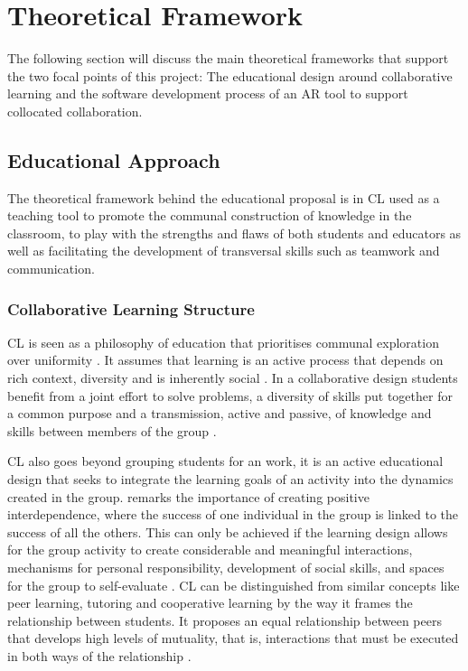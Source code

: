 \section{Theoretical Framework \label{sec:3-3}}

The following section will discuss the main theoretical frameworks that support the two focal points of this project: The educational design around collaborative learning and the
software development process of an \ac{AR} tool to support collocated collaboration.

\subsection{Educational Approach \label{sec:3-3-1}}

The theoretical framework behind the educational proposal is in \acf{CL} used as a teaching tool to promote the communal construction of knowledge in the
classroom, to play with the strengths and flaws of both students and educators as well as facilitating the development of transversal skills such as teamwork and
communication.

\subsubsection{Collaborative Learning Structure \label{sec:3-3-1-1}}

\ac{CL} is seen as a philosophy of education that prioritises communal exploration over uniformity \parencite{eskiyurt_2024}. It assumes that learning is an
active process that depends on rich context, diversity and is inherently social \parencite{smith_1993}. In a collaborative design students benefit from a joint effort to
solve problems, a diversity of skills put together for a common purpose and a transmission, active and passive, of knowledge and skills between members of the group
\parencite{laal_2012,buchs_2015}.

\ac{CL} also goes beyond grouping students for an work, it is an active educational design that seeks to integrate the learning goals of an activity into the dynamics
created in the group. \textcite{laal_2012} remarks the importance of creating positive interdependence, where the success of one individual in the group is linked to the success of
all the others. This can only be achieved if the learning design allows for the group activity to create considerable and meaningful
interactions, mechanisms for personal responsibility, development of social skills, and spaces for the group to self-evaluate \parencite{johnson_1990}. \ac{CL} can be
distinguished from similar concepts like peer learning, tutoring and cooperative learning by the way it frames the relationship between students. It proposes an equal
relationship between peers that develops high levels of mutuality, that is, interactions that must be executed in both ways of the relationship \parencite{odonnell_2013}.

